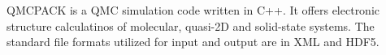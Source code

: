 QMCPACK is a QMC simulation code written in C++. It offers electronic structure calculatinos of molecular, quasi-2D and solid-state systems. The standard file formats utilized for input and output are in XML and HDF5.